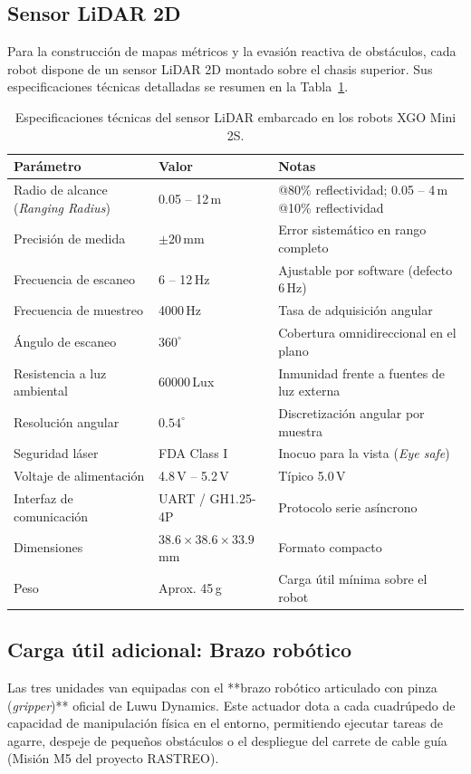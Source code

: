 \subsection{Sensor LiDAR 2D}
Para la construcción de mapas métricos y la evasión reactiva de obstáculos, cada robot dispone de un sensor LiDAR 2D montado sobre el chasis superior. Sus especificaciones técnicas detalladas se resumen en la Tabla~\ref{tab:especificaciones_lidar}.

\begin{table}[htbp]
    \centering
    \caption{Especificaciones técnicas del sensor LiDAR embarcado en los robots XGO Mini 2S.}
    \label{tab:especificaciones_lidar}
    \begin{tabular}{p{5.5cm} p{3.5cm} p{5.5cm}}
        \toprule
        \textbf{Parámetro} & \textbf{Valor} & \textbf{Notas} \\
        \midrule
        Radio de alcance (\textit{Ranging Radius}) & 0.05 -- 12\,m & @80\% reflectividad; 0.05 -- 4\,m @10\% reflectividad \\
        Precisión de medida & $\pm 20$\,mm & Error sistemático en rango completo \\
        Frecuencia de escaneo & 6 -- 12\,Hz & Ajustable por software (defecto 6\,Hz) \\
        Frecuencia de muestreo & 4000\,Hz & Tasa de adquisición angular \\
        Ángulo de escaneo & $360^\circ$ & Cobertura omnidireccional en el plano \\
        Resistencia a luz ambiental & 60000\,Lux & Inmunidad frente a fuentes de luz externa \\
        Resolución angular & $0.54^\circ$ & Discretización angular por muestra \\
        Seguridad láser & FDA Class I & Inocuo para la vista (\textit{Eye safe}) \\
        Voltaje de alimentación & 4.8\,V -- 5.2\,V & Típico 5.0\,V \\
        Interfaz de comunicación & UART / GH1.25-4P & Protocolo serie asíncrono \\
        Dimensiones & $38.6 \times 38.6 \times 33.9$\,mm & Formato compacto \\
        Peso & Aprox. 45\,g & Carga útil mínima sobre el robot \\
        \bottomrule
    \end{tabular}
\end{table}

\subsection{Carga útil adicional: Brazo robótico}
Las tres unidades van equipadas con el **brazo robótico articulado con pinza (\textit{gripper})** oficial de Luwu Dynamics. Este actuador dota a cada cuadrúpedo de capacidad de manipulación física en el entorno, permitiendo ejecutar tareas de agarre, despeje de pequeños obstáculos o el despliegue del carrete de cable guía (Misión M5 del proyecto RASTREO).


